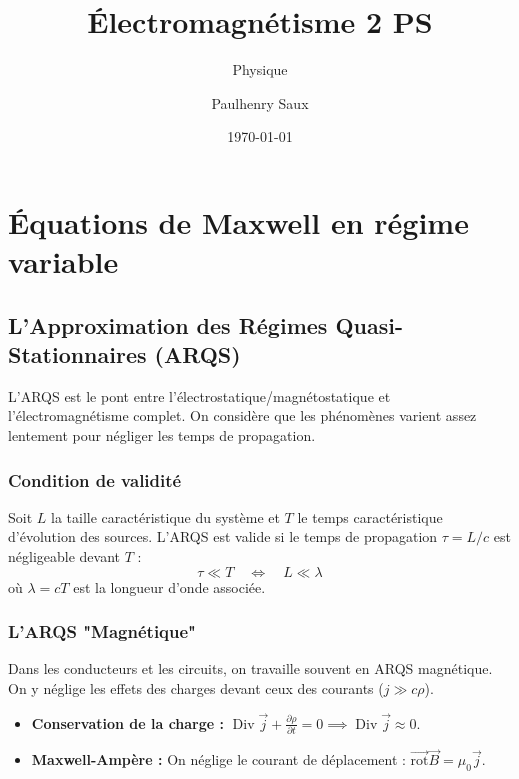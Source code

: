 \documentclass[french]{yLectureNote}
\title{Électromagnétisme 2 PS}
\subtitle{Physique}
\author{Paulhenry Saux}
\date{\today}
\renewcommand{\vec}{\overrightarrow}
\DeclareMathOperator{\Div}{Div}
\newcommand{\rot}{\vec{\mathrm{rot}}}
\begin{document}
\chapter{Équations de Maxwell en régime variable}
\section{L'Approximation des Régimes Quasi-Stationnaires (ARQS)}

L'ARQS est le pont entre l'électrostatique/magnétostatique et l'électromagnétisme complet. On considère que les phénomènes varient assez lentement pour négliger les temps de propagation.

\subsection{Condition de validité}

\begin{definition}
    Soit $L$ la taille caractéristique du système et $T$ le temps caractéristique d'évolution des sources. L'ARQS est valide si le temps de propagation $\tau = L/c$ est négligeable devant $T$ :
    \begin{equation}
        \tau \ll T \quad \Longleftrightarrow \quad L \ll \lambda
    \end{equation}
    où $\lambda = cT$ est la longueur d'onde associée.
\end{definition}


\subsection{L'ARQS "Magnétique"}

Dans les conducteurs et les circuits, on travaille souvent en ARQS magnétique. On y néglige les effets des charges devant ceux des courants ($j \gg c\rho$).

\begin{proposition}
    \begin{itemize}
        \item \textbf{Conservation de la charge :} $\Div \vec{j} + \frac{\partial \rho}{\partial t} = 0 \implies \Div \vec{j} \approx 0$.
        \item \textbf{Maxwell-Ampère :} On néglige le courant de déplacement : $\rot \vec{B} = \mu_0 \vec{j}$.
    \end{itemize}
\end{proposition}
\end{document}
